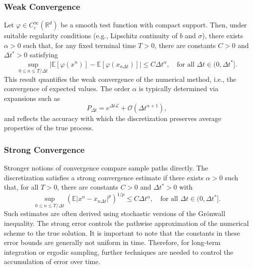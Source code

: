 \documentclass{article}
\begin{document}
\subsubsection{Weak Convergence}

Let $\varphi \in C^\infty_c(\mathbb{R}^d)$ be a smooth test function with compact support. Then, under suitable regularity conditions (e.g., Lipschitz continuity of $b$ and $\sigma$), there exists $\alpha > 0$ such that, for any fixed terminal time $T > 0$, there are constants $C > 0$ and $\Delta t^* > 0$ satisfying
\[
\sup_{0 \leq n \leq T/\Delta t} \left| \mathbb{E}[\varphi(x^n)] - \mathbb{E}[\varphi(x_{n\Delta t})] \right| \leq C \Delta t^\alpha,
\quad \text{for all } \Delta t \in (0, \Delta t^*].
\]
This result quantifies the weak convergence of the numerical method, i.e., the convergence of expected values. The order $\alpha$ is typically determined via expansions such as
\[
P_{\Delta t} = e^{\Delta t \mathcal{L}} + \mathcal{O}(\Delta t^{\alpha+1}),
\]
and reflects the accuracy with which the discretization preserves average properties of the true process.

\subsubsection{Strong Convergence}

Stronger notions of convergence compare sample paths directly. The discretization satisfies a strong convergence estimate if there exists $\alpha > 0$ such that, for all $T > 0$, there are constants $C > 0$ and $\Delta t^* > 0$ with
\[
\sup_{0 \leq n \leq T/\Delta t} \left( \mathbb{E} \left| x^n - x_{n\Delta t} \right|^p \right)^{1/p} \leq C \Delta t^\alpha,
\quad \text{for all } \Delta t \in (0, \Delta t^*].
\]
Such estimates are often derived using stochastic versions of the Gr\"{o}nwall inequality. The strong error controls the pathwise approximation of the numerical scheme to the true solution.
It is important to note that the constants in these error bounds are generally not uniform in time. Therefore, for long-term integration or ergodic sampling, further techniques are needed to control the accumulation of error over time.
\end{document}
